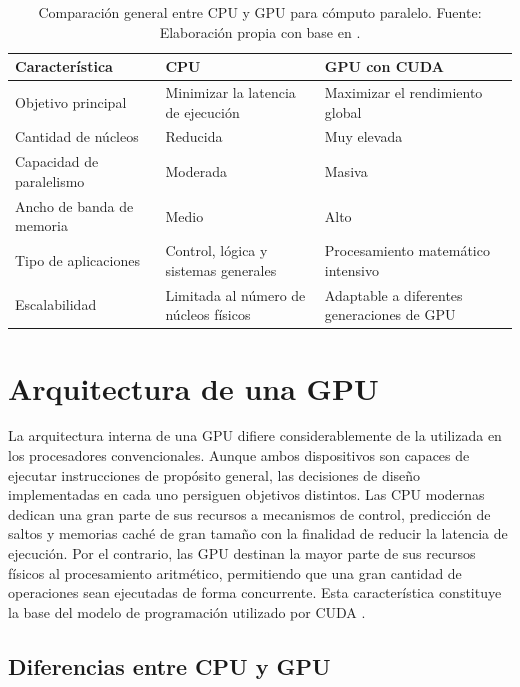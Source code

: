 \begin{table}[H]
\centering
\caption{Comparación general entre CPU y GPU para cómputo paralelo. Fuente: Elaboración propia con base en \cite{awsGPUCPU,nvidiaProgrammingGuide}.}
\label{tab:cpu_gpu_comparacion}
\begin{tabular}{|p{4cm}|p{5cm}|p{5cm}|}
\hline
\textbf{Característica} & \textbf{CPU} & \textbf{GPU con CUDA} \\
\hline
Objetivo principal & Minimizar la latencia de ejecución & Maximizar el rendimiento global \\
\hline
Cantidad de núcleos & Reducida & Muy elevada \\
\hline
Capacidad de paralelismo & Moderada & Masiva \\
\hline
Ancho de banda de memoria & Medio & Alto \\
\hline
Tipo de aplicaciones & Control, lógica y sistemas generales & Procesamiento matemático intensivo \\
\hline
Escalabilidad & Limitada al número de núcleos físicos & Adaptable a diferentes generaciones de GPU \\
\hline
\end{tabular}
\end{table}

\section{Arquitectura de una GPU}

La arquitectura interna de una GPU difiere considerablemente de la utilizada en los procesadores convencionales. Aunque ambos dispositivos son capaces de ejecutar instrucciones de propósito general, las decisiones de diseño implementadas en cada uno persiguen objetivos distintos. Las CPU modernas dedican una gran parte de sus recursos a mecanismos de control, predicción de saltos y memorias caché de gran tamaño con la finalidad de reducir la latencia de ejecución. Por el contrario, las GPU destinan la mayor parte de sus recursos físicos al procesamiento aritmético, permitiendo que una gran cantidad de operaciones sean ejecutadas de forma concurrente. Esta característica constituye la base del modelo de programación utilizado por CUDA \cite{awsGPUCPU,nvidiaProgrammingGuide}.

\subsection{Diferencias entre CPU y GPU}

